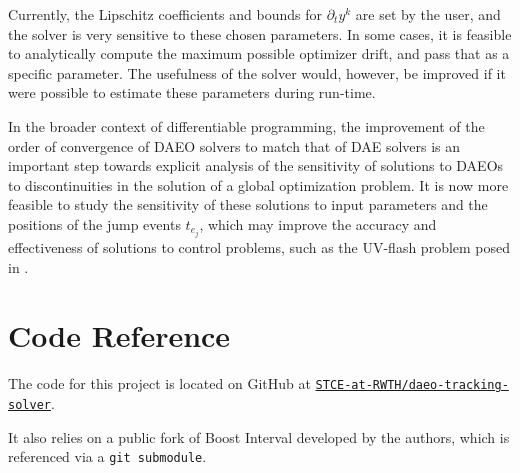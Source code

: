 \documentclass[twoside,leqno, twocolumn]{article}
\begin{document}
Currently, the Lipschitz coefficients and bounds for $\partial_ty^k$ are set by the user, and the solver is very sensitive to these chosen parameters. In some cases, it is feasible to analytically compute the maximum possible optimizer drift, and pass that as a specific parameter. The usefulness of the solver would, however, be improved if it were possible to estimate these parameters during run-time.



In the broader context of differentiable programming, the improvement of the order of convergence of DAEO solvers to match that of DAE solvers is an important step towards explicit analysis of the sensitivity of solutions to DAEOs to discontinuities in the solution of a global optimization problem. It is now more feasible to study the sensitivity of these solutions to input parameters and the positions of the jump events $t_{e_j}$, which may improve the accuracy and effectiveness of solutions to control problems, such as the UV-flash problem posed in \cite{ritschelAlgorithmGradientbasedDynamic2018}. 


\appendix
\section{Code Reference}
The code for this project is located on GitHub at
\href{https://github.com/STCE-at-RWTH/daeo-tracking-solver}{\texttt{STCE-at-RWTH/daeo-tracking-solver}}. 

It also relies on a public fork of Boost Interval developed by the authors, which is referenced via a \texttt{git submodule}.


\printbibliography
\end{document}
